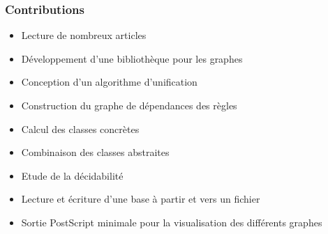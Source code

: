 \begin{frame}
	\frametitle{Contributions}
	\begin{itemize}
		\item Lecture de nombreux articles
		\item Développement d'une bibliothèque pour les graphes
		\item Conception d'un algorithme d'unification
		\item Construction du graphe de dépendances des règles
		\item Calcul des classes concrètes
		\item Combinaison des classes abstraites
		\item Etude de la décidabilité
		\item Lecture et écriture d'une base à partir et vers un fichier
		\item Sortie PostScript minimale pour la visualisation des différents graphes
	\end{itemize}
\end{frame}



